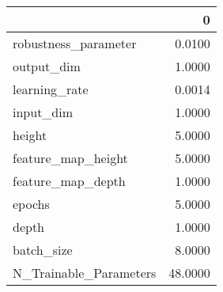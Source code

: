 \begin{tabular}{lr}
\toprule
{} &        0 \\
\midrule
robustness\_parameter   &   0.0100 \\
output\_dim             &   1.0000 \\
learning\_rate          &   0.0014 \\
input\_dim              &   1.0000 \\
height                 &   5.0000 \\
feature\_map\_height     &   5.0000 \\
feature\_map\_depth      &   1.0000 \\
epochs                 &   5.0000 \\
depth                  &   1.0000 \\
batch\_size             &   8.0000 \\
N\_Trainable\_Parameters &  48.0000 \\
\bottomrule
\end{tabular}
